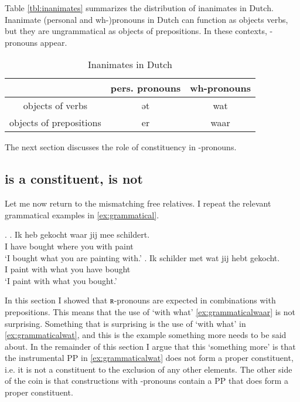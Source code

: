 \documentclass{article}
\begin{document}
Table \ref{tbl:inanimates} summarizes the distribution of inanimates in Dutch. Inanimate (personal and wh-)pronouns in Dutch can function as objects verbs, but they are ungrammatical as objects of prepositions. In these contexts, -pronouns appear.

\begin{table}[ht]
	\center
	\caption {Inanimates in Dutch}
	\begin{minipage}{0.45\linewidth}
		\begin{tabularx}{\textwidth}{ccc}
		\toprule
                        & pers. pronouns & wh-pronouns \\
  	\midrule
objects of verbs        & ət             & wat         \\
objects of prepositions & er             & waar        \\
\bottomrule
\end{tabularx}
\end{minipage}
\end{table}\label{tbl:inanimates}

The next section discusses the role of constituency in -pronouns.


\subsection{ is a constituent,  is not}

Let me now return to the mismatching free relatives. I repeat the relevant grammatical examples in \ref{ex:grammatical}.

\ex.\label{ex:grammatical}
\ag. Ik heb gekocht waar jij mee schildert.\\
 I have bought where you with paint\\
 `I bought what you are painting with.'\label{ex:grammaticalwaar}
\bg. Ik schilder met wat jij hebt gekocht.\\
 I paint with what you have bought\\
 `I paint with what you bought.'\label{ex:grammaticalwat}

In this section I showed that ʀ-pronouns are expected in combinations with prepositions. This means that the use of  `with what' \ref{ex:grammaticalwaar} is not surprising. Something that is surprising is the use of  `with what' in \ref{ex:grammaticalwat}, and this is the example something more needs to be said about. In the remainder of this section I argue that this `something more' is that the instrumental PP in \ref{ex:grammaticalwat} does not form a proper constituent, i.e. it is not a constituent to the exclusion of any other elements. The other side of the coin is that constructions with -pronouns contain a PP that does form a proper constituent.
\end{document}
